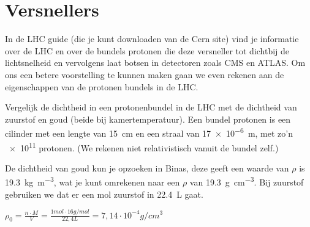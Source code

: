 \begin{questions}
\begin{figure}
{\begin{tikzpicture}
\end{tikzpicture}
}

\label{fig:Pion_feynman}
\end{figure}

\section{ Versnellers}

In de LHC guide (die je kunt downloaden van de Cern site) vind je
informatie over de LHC en over de bundels protonen die deze versneller
tot dichtbij de lichtsnelheid en vervolgens laat botsen in detectoren
zoals CMS en ATLAS. Om ons een betere voorstelling te kunnen maken gaan
we even rekenen aan de eigenschappen van de protonen bundels in de LHC.

\question
Vergelijk de dichtheid in een protonenbundel in de LHC met de dichtheid van zuurstof en goud 
(beide bij kamertemperatuur). Een bundel protonen is een cilinder met een lengte 
van \SI{15}{\centi\meter} en een straal van \SI{17e-6}{m}, met zo'n \SI{e11}{} protonen.
(We rekenen niet relativistisch vanuit de bundel zelf.)
 

De dichtheid van goud kun je opzoeken in Binas, deze geeft een waarde van 
$\rho$ is \SI{19.3}{\kilogram\per\cubic\meter}, wat je kunt omrekenen naar
een $\rho$ van \SI{19.3}{\gram\per\cubic\centi\meter}. 
Bij zuurstof gebruiken we dat er een mol zuurstof in \SI{22.4}{\liter} gaat.

$\rho_0 = \frac{n \cdot M}{V} = \frac {1 mol \cdot 16 g/mol}{22,4 L} = 7,14 \cdot 10^{-4} g/cm^{3} $


\end{questions}
